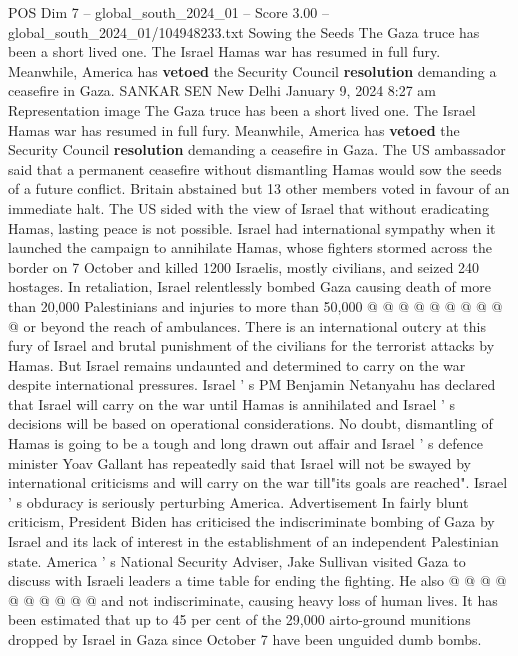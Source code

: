 \begin{textsample}{POS Dim 7 – global\_south\_2024\_01 – Score 3.00 – global\_south\_2024\_01/104948233.txt}  \label{ex:f7_pos_044}
Sowing the Seeds The Gaza truce has been a short lived one.
The Israel Hamas war has resumed in full fury.
Meanwhile, America has \textbf{vetoed} the Security Council \textbf{resolution} demanding a ceasefire in Gaza.
SANKAR SEN New Delhi January 9, 2024 8:27 am Representation image The Gaza truce has been a short lived one.
The Israel Hamas war has resumed in full fury.
Meanwhile, America has \textbf{vetoed} the Security Council \textbf{resolution} demanding a ceasefire in Gaza.
The US ambassador said that a permanent ceasefire without dismantling Hamas would sow the seeds of a future conflict.
Britain abstained but 13 other members voted in favour of an immediate halt.
The US sided with the view of Israel that without eradicating Hamas, lasting peace is not possible.
Israel had international sympathy when it launched the campaign to annihilate Hamas, whose fighters stormed across the border on 7 October and killed 1200 Israelis, mostly civilians, and seized 240 hostages.
In retaliation, Israel relentlessly bombed Gaza causing death of more than 20,000 Palestinians and injuries to more than 50,000 @ @ @ @ @ @ @ @ @ @ or beyond the reach of ambulances.
There is an international outcry at this fury of Israel and brutal punishment of the civilians for the terrorist attacks by Hamas.
But Israel remains undaunted and determined to carry on the war despite international pressures.
Israel ' s PM Benjamin Netanyahu has declared that Israel will carry on the war until Hamas is annihilated and Israel ' s decisions will be based on operational considerations.
No doubt, dismantling of Hamas is going to be a tough and long drawn out affair and Israel ' s defence minister Yoav Gallant has repeatedly said that Israel will not be swayed by international criticisms and will carry on the war till"its goals are reached".
Israel ' s obduracy is seriously perturbing America.
Advertisement In fairly blunt criticism, President Biden has criticised the indiscriminate bombing of Gaza by Israel and its lack of interest in the establishment of an independent Palestinian state.
America ' s National Security Adviser, Jake Sullivan visited Gaza to discuss with Israeli leaders a time table for ending the fighting.
He also @ @ @ @ @ @ @ @ @ @ and not indiscriminate, causing heavy loss of human lives.
It has been estimated that up to 45 per cent of the 29,000 airto-ground munitions dropped by Israel in Gaza since October 7 have been unguided dumb bombs.

\end{textsample}
